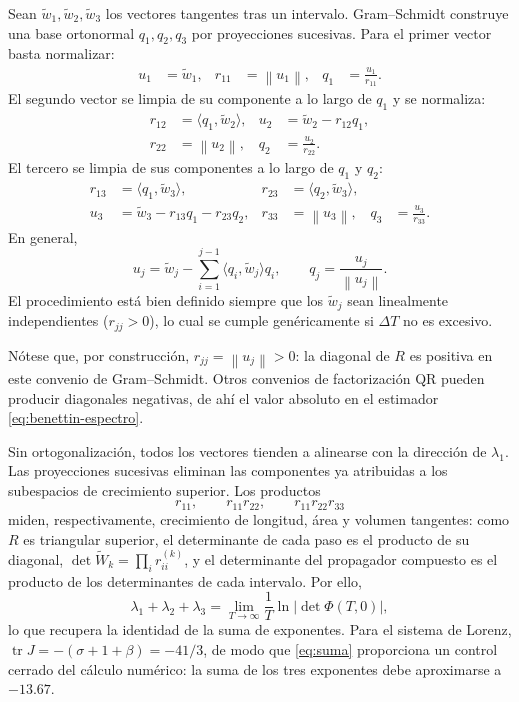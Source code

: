 \documentclass[12pt,a4paper,oneside]{report}
\theoremstyle{definition}
\numberwithin{equation}{chapter}
\newcommand{\norm}[1]{\left\lVert #1\right\rVert}
\newcommand{\abs}[1]{\left|#1\right|}
\begin{document}
Sean \(\widetilde w_1,\widetilde w_2,\widetilde w_3\) los vectores tangentes tras un intervalo. Gram--Schmidt construye una base ortonormal \(q_1,q_2,q_3\) por proyecciones sucesivas. Para el primer vector basta normalizar:
\begin{align}
    u_1&=\widetilde w_1, & r_{11}&=\norm{u_1}, & q_1&=\frac{u_1}{r_{11}}.
\end{align}
El segundo vector se limpia de su componente a lo largo de \(q_1\) y se normaliza:
\begin{align}
    r_{12}&=\langle q_1,\widetilde w_2\rangle, & u_2&=\widetilde w_2-r_{12}q_1,\\
    r_{22}&=\norm{u_2}, & q_2&=\frac{u_2}{r_{22}}.
\end{align}
El tercero se limpia de sus componentes a lo largo de \(q_1\) y \(q_2\):
\begin{align}
    r_{13}&=\langle q_1,\widetilde w_3\rangle, &
    r_{23}&=\langle q_2,\widetilde w_3\rangle,\\
    u_3&=\widetilde w_3-r_{13}q_1-r_{23}q_2, &
    r_{33}&=\norm{u_3}, &
    q_3&=\frac{u_3}{r_{33}}.
\end{align}
En general,
\begin{equation}
    u_j=\widetilde w_j- \sum_{i=1}^{j-1} \langle q_i,\widetilde w_j\rangle q_i, \qquad q_j=\frac{u_j}{\norm{u_j}}.
\end{equation}
El procedimiento está bien definido siempre que los \(\widetilde w_j\)
sean linealmente independientes (\(r_{jj}>0\)), lo cual se cumple
genéricamente si \(\Delta T\) no es excesivo.

Nótese que, por construcción, \(r_{jj}=\norm{u_j}>0\): la diagonal de
\(R\) es positiva en este convenio de Gram--Schmidt. Otros convenios de
factorización QR pueden producir diagonales negativas, de ahí el valor
absoluto en el estimador \eqref{eq:benettin-espectro}.

Sin ortogonalización, todos los vectores tienden a alinearse con la dirección de \(\lambda_1\). Las proyecciones sucesivas eliminan las componentes ya atribuidas a los subespacios de crecimiento superior. Los productos
\[
    r_{11},\qquad r_{11}r_{22},\qquad r_{11}r_{22}r_{33}
\]
miden, respectivamente, crecimiento de longitud, área y volumen tangentes: como \(R\) es triangular superior, el determinante de cada paso es el producto de su diagonal, \(\det\widetilde W_k=\prod_i r_{ii}^{(k)}\), y el determinante del propagador compuesto es el producto de los determinantes de cada intervalo. Por ello,
\begin{equation}
    \lambda_1+\lambda_2+\lambda_3 = \lim_{T\to\infty}\frac1T \ln\abs{\det\Phi(T,0)},
    \label{eq:suma}
\end{equation}
lo que recupera la identidad de la suma de exponentes. Para el sistema de Lorenz, \(\operatorname{tr}J=-(\sigma+1+\beta)=-41/3\), de modo que \eqref{eq:suma} proporciona un control cerrado del cálculo numérico: la suma de los tres exponentes debe aproximarse a \(-13.67\).
\end{document}
